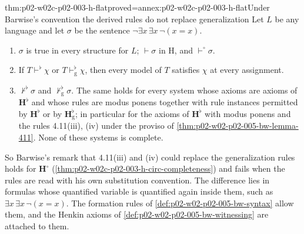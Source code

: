 \begin{hbtheorem}{thm:p02-w02c-p02-003-h-flat}{proved=annex:p02-w02c-p02-003-h-flat}{Under Barwise's convention the derived rules do not replace generalization}
Let \(L\) be any language and let \(\sigma\) be the sentence
\(\neg\exists x\,\exists x\,\neg(x=x)\).
\begin{enumerate}
\item \(\sigma\) is true in every structure for \(L\); \(\vdash\sigma\) in
      H, and \(\vdash^{\circ}\sigma\).
\item If \(T\vdash^{\flat}\chi\) or \(T\vdash^{\flat}_{\mathrm g}\chi\),
      then every model of \(T\) satisfies \(\chi\) at every assignment.
\item \(\nvdash^{\flat}\sigma\) and \(\nvdash^{\flat}_{\mathrm g}\sigma\).
      The same holds for every system whose axioms are axioms of
      \(\mathbf H^{\flat}\) and whose rules are modus ponens together with
      rule instances permitted by \(\mathbf H^{\flat}\) or by
      \(\mathbf H^{\flat}_{\mathrm g}\); in particular for the axioms of
      \(\mathbf H^{\flat}\) with modus ponens and the rules 4.11(iii),
      (iv) under the proviso of \cref{thm:p02-w02-p02-005-bw-lemma-411}.
      None of these systems is complete.
\end{enumerate}
\end{hbtheorem}

So Barwise's remark that 4.11(iii) and (iv) could replace the
generalization rules holds for \(\mathbf H^{\circ}\)
(\cref{thm:p02-w02c-p02-003-h-circ-completeness}) and fails when the rules
are read with his own substitution convention.  The difference lies in
formulas whose quantified variable is quantified again inside them, such
as \(\exists x\,\exists x\,\neg(x=x)\).  The formation rules of
\cref{def:p02-w02-p02-005-bw-syntax} allow them, and the Henkin axioms of
\cref{def:p02-w02-p02-005-bw-witnessing} are attached to them.

